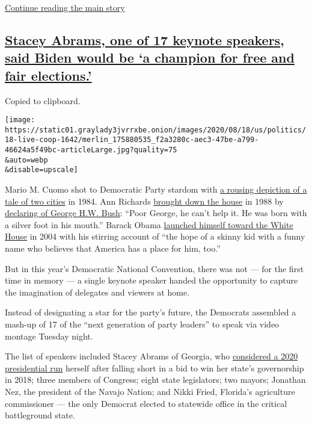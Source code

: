 \protect\hyperlink{after-dfp-ad-mid5}{Continue reading the main story}

\hypertarget{stacey-abrams-one-of-17-keynote-speakers-said-biden-would-be-a-champion-for-free-and-fair-elections}{%
\subsection{\texorpdfstring{\protect\hyperlink{stacey-abrams-one-of-17-keynote-speakers-said-biden-would-be-a-champion-for-free-and-fair-elections}{Stacey
Abrams, one of 17 keynote speakers, said Biden would be `a champion for
free and fair
elections.'}}{Stacey Abrams, one of 17 keynote speakers, said Biden would be `a champion for free and fair elections.'}}\label{stacey-abrams-one-of-17-keynote-speakers-said-biden-would-be-a-champion-for-free-and-fair-elections}}

Copied to clipboard.

\texttt{[image: https://static01.graylady3jvrrxbe.onion/images/2020/08/18/us/politics/18-live-coop-1642/merlin\_175880535\_f2a3280c-aec3-47be-a799-46624a5f49bc-articleLarge.jpg?quality=75\\\&auto=webp\\\&disable=upscale]}

Mario M. Cuomo shot to Democratic Party stardom with
\href{https://www.nytimes3xbfgragh.onion/1984/07/17/us/transcript-of-keynote-address-by-cuomo-to-the-convention.html}{a
rousing depiction of a tale of two cities} in 1984. Ann Richards
\href{https://www.youtube.com/watch?v=p-tyKWNwtMU}{brought down the
house} in 1988 by
\href{https://www.nytimes3xbfgragh.onion/1988/07/19/us/transcript-of-the-keynote-address-by-ann-richards-the-texas-treasurer.html}{declaring
of George H.W. Bush}: ``Poor George, he can't help it. He was born with
a silver foot in his mouth.'' Barack Obama
\href{https://www.nytimes3xbfgragh.onion/2016/07/27/magazine/the-speech-that-made-obama.html}{launched
himself toward the White House} in 2004 with his stirring account of
``the hope of a skinny kid with a funny name who believes that America
has a place for him, too.''

But in this year's Democratic National Convention, there was not --- for
the first time in memory --- a single keynote speaker handed the
opportunity to capture the imagination of delegates and viewers at home.

Instead of designating a star for the party's future, the Democrats
assembled a mash-up of 17 of the ``next generation of party leaders'' to
speak via video montage Tuesday night.

The list of speakers included Stacey Abrams of Georgia, who
\href{https://www.nytimes3xbfgragh.onion/2019/08/13/us/politics/stacey-abrams-fair-fight-2020.html}{considered
a 2020 presidential run} herself after falling short in a bid to win her
state's governorship in 2018; three members of Congress; eight state
legislators; two mayors; Jonathan Nez, the president of the Navajo
Nation; and Nikki Fried, Florida's agriculture commissioner --- the only
Democrat elected to statewide office in the critical battleground state.

